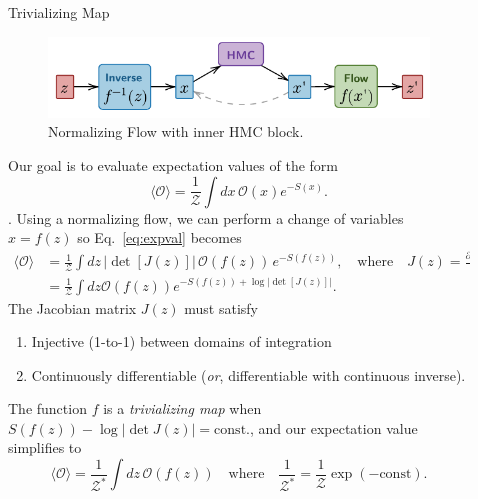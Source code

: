 \documentclass[final]{beamer}
\newlength{\sepwidth}
\newlength{\colwidth}
\newcommand{\separatorcolumn}{\begin{column}{\sepwidth}\end{column}}
\begin{document}
\begin{frame}[t]
\begin{columns}[t]
\begin{column}{\colwidth}
\end{column}

\separatorcolumn

\begin{column}{\colwidth}

  \begin{block}{Trivializing Map}
    \begin{figure}
      \centering
      \includegraphics[width=\columnwidth]{assets/ftHMC}
      \caption{\label{fig:ftHMC}Normalizing Flow with inner HMC block.}
    \end{figure}
    Our goal is to evaluate expectation values of the form
    \begin{equation}
      \langle \mathcal{O}\rangle = \frac{1}{\mathcal{Z}}\int dx \,\mathcal{O}(x) e^{-S(x)}.
      \label{eq:expval}
    \end{equation}.
    Using a normalizing flow, we can perform a change of variables \(x = f(z)\) so Eq.~\ref{eq:expval} becomes 
    \begin{align}
      \langle \mathcal{O}\rangle 
        &= \frac{1}{\mathcal{Z}}\int dz\, |\det[J(z)]|\, \mathcal{O}(f(z))\,
        e^{-S(f(z))}, \quad\text{where}\quad J(z) = \frac{\partial f(z)}{\partial z} \\
        &= \frac{1}{\mathcal{Z}}\int dz \mathcal{O}(f(z)) e^{-S(f(z)) + \log|\det[J(z)]|}.
      \label{eq:expval_modified}
    \end{align}
    The Jacobian matrix \(J(z)\) must satisfy
    \begin{enumerate}
      \item Injective (1-to-1) between domains of integration
      \item Continuously differentiable (\emph{or}, differentiable with continuous inverse).
    \end{enumerate}
    The function \(f\) is a \emph{trivializing map} when \(S(f(z)) - \log|\det J(z)| = \text{const.}\), and our
    expectation value simplifies to 
    \begin{equation}
      \langle \mathcal{O}\rangle = \frac{1}{\mathcal{Z^{*}}}\int dz\, \mathcal{O}(f(z))\quad\text{where}\quad
      \frac{1}{\mathcal{Z^{*}}} = \frac{1}{\mathcal{Z}}\exp(-\mathrm{const}).

\end{equation}
\end{block}
\end{column}
\end{columns}
\end{frame}
\end{document}
